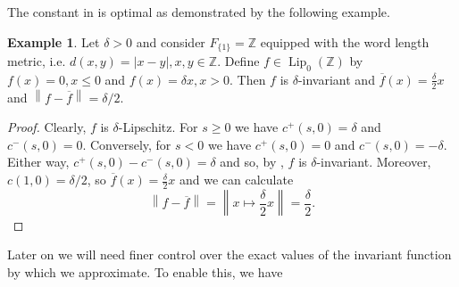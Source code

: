 \documentclass[11pt,a4paper]{amsart}
\theoremstyle{definition}
\newtheorem{example}[theorem]{Example}
\newcommand{\Z}{\mathbb{Z}}
\newcommand{\fBar}{\overline{f}}
\newcommand{\abs}[1]{\left| #1 \right|}
\newcommand{\norm}[1]{\left\| #1 \right\|}
\newcommand{\Lipz}{\operatorname{Lip}_0}
\begin{document}
	The constant in  is optimal as demonstrated by the following example.
	\begin{example}
		Let $\delta > 0$ and consider $F_{\{1\}} = \Z$ equipped with the word length metric, i.e. $d(x, y) = \abs{x-y}, x,y\in\Z$. Define $f \in \Lipz(\Z)$ by $f(x) = 0, x \leq 0$ and $f(x) = \delta x, x > 0$. Then $f$ is $\delta$-invariant and $\fBar(x) = \frac{\delta}{2}x$ and $\norm{f-\fBar} = \delta/2$.
	\end{example}
	\begin{proof}
		Clearly, $f$ is $\delta$-Lipschitz. For $s \geq 0$ we have $c^+(s, 0) = \delta$ and $c^-(s, 0) = 0$. Conversely, for $s < 0$ we have $c^+(s, 0) = 0$ and $c^-(s, 0) = -\delta$. Either way, $c^+(s, 0) - c^-(s, 0) = \delta$ and so, by , $f$ is $\delta$-invariant. Moreover, $c(1, 0) = \delta/2$, so $\fBar(x) = \frac{\delta}{2}x$ and we can calculate
		\begin{equation*}
			\norm{f - \fBar} = \norm{x \mapsto \frac{\delta}{2}x} = \frac{\delta}{2}.
		\end{equation*}
	\end{proof}
	
	Later on we will need finer control over the exact values of the invariant function by which we approximate. To enable this, we have
	
\end{document}

